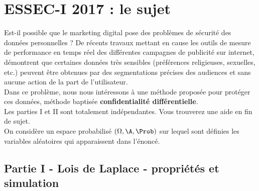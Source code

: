 \chapter*{ESSEC-I 2017 : le sujet}
  
%

\noindent
Est-il possible que le marketing digital pose des problèmes de
sécurité des données personnelles ? De récents travaux %
mettant en cause les outils de mesure de performance en temps réel des
différentes campagnes de publicité sur internet, démontrent que
certaines données très sensibles (préférences religieuses, sexuelles,
etc.) peuvent être obtenues par des segmentations précises des
audiences et sans aucune action de la part de l'utilisateur.\\[.2cm]
Dans ce problème, nous nous intéressons à une méthode proposée pour
protéger ces données, méthode baptisée {\bf confidentialité
  différentielle}.\\[.2cm]
Les parties I et II sont totalement indépendantes. Vous trouverez une
aide \Scilab{} en fin de sujet.\\[.2cm]
On considère un espace probabilisé $(\Omega, \A , \Prob)$ sur lequel
sont définies les variables aléatoires qui apparaissent dans l'énoncé.

\section*{Partie I - Lois de Laplace - propriétés et simulation}

